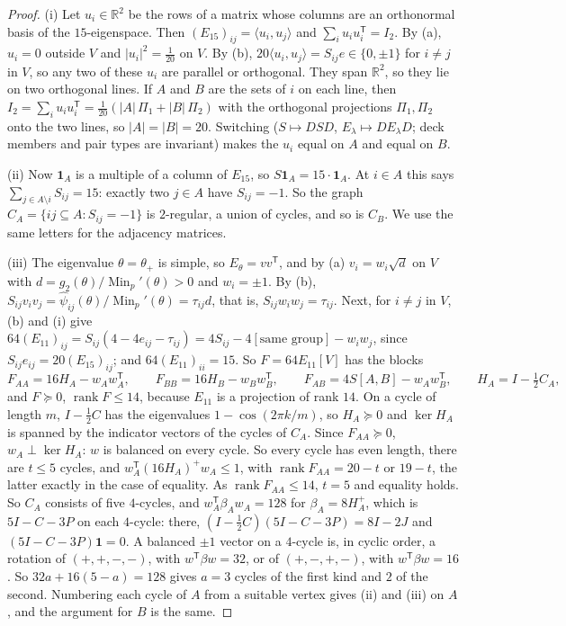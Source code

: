 \documentclass[11pt]{article}
\theoremstyle{definition}
\newcommand{\R}{\mathbb{R}}
\newcommand{\Min}{\operatorname{Min}}
\begin{document}
\begin{proof}
(i) Let $u_i\in\R^2$ be the rows of a matrix whose columns are an orthonormal basis of the
$15$-eigenspace. Then $(E_{15})_{ij}=\langle u_i,u_j\rangle$ and $\sum_iu_iu_i^{\mathsf T}=I_2$. By (a),
$u_i=0$ outside $V$ and $|u_i|^2=\frac1{20}$ on $V$. By (b), $20\langle u_i,u_j\rangle=S_{ij}e\in\{0,\pm1\}$
for $i\ne j$ in $V$, so any two of these $u_i$ are parallel or orthogonal. They span $\R^2$, so they lie on
two orthogonal lines. If $A$ and $B$ are the sets of $i$ on each line, then
$I_2=\sum_iu_iu_i^{\mathsf T}=\frac1{20}(|A|\,\Pi_1+|B|\,\Pi_2)$ with the orthogonal projections $\Pi_1,\Pi_2$
onto the two lines, so $|A|=|B|=20$. Switching ($S\mapsto DSD$, $E_\lambda\mapsto DE_\lambda D$; deck
members and pair types are invariant) makes the $u_i$ equal on $A$ and equal on $B$.

(ii) Now $\mathbf 1_A$ is a multiple of a column of $E_{15}$, so $S\mathbf 1_A=15\cdot\mathbf 1_A$. At
$i\in A$ this says $\sum_{j\in A\setminus i}S_{ij}=15$: exactly two $j\in A$ have $S_{ij}=-1$. So the graph
$C_A=\{ij\subseteq A:S_{ij}=-1\}$ is $2$-regular, a union of cycles, and so is $C_B$. We use the same
letters for the adjacency matrices.

(iii) The eigenvalue $\theta=\theta_+$ is simple, so $E_\theta=vv^{\mathsf T}$, and by (a) $v_i=w_i\sqrt d$
on $V$ with $d=g_2(\theta)/\Min_p'(\theta)>0$ and $w_i=\pm1$. By (b),
$S_{ij}v_iv_j=\widehat\psi_{ij}(\theta)/\Min_p'(\theta)=\tau_{ij}d$, that is, $S_{ij}w_iw_j=\tau_{ij}$. Next, for
$i\ne j$ in $V$, (b) and (i) give $64(E_{11})_{ij}=S_{ij}(4-4e_{ij}-\tau_{ij})=4S_{ij}-4[\text{same
group}]-w_iw_j$, since $S_{ij}e_{ij}=20(E_{15})_{ij}$; and $64(E_{11})_{ii}=15$. So $F=64E_{11}[V]$ has the
blocks
\[
F_{AA}=16H_A-w_Aw_A^{\mathsf T},\qquad F_{BB}=16H_B-w_Bw_B^{\mathsf T},\qquad
F_{AB}=4S[A,B]-w_Aw_B^{\mathsf T},\qquad H_A=I-\tfrac12C_A,
\]
and $F\succeq0$, $\operatorname{rank}F\le14$, because $E_{11}$ is a projection of rank $14$. On a cycle of
length $m$, $I-\frac12C$ has the eigenvalues $1-\cos(2\pi k/m)$, so $H_A\succeq0$ and $\ker H_A$ is
spanned by the indicator vectors of the cycles of $C_A$. Since $F_{AA}\succeq0$, $w_A\perp\ker H_A$: $w$
is balanced on every cycle. So every cycle has even length, there are $t\le5$ cycles, and
$w_A^{\mathsf T}(16H_A)^+w_A\le1$, with $\operatorname{rank}F_{AA}=20-t$ or $19-t$, the latter exactly in
the case of equality. As $\operatorname{rank}F_{AA}\le14$, $t=5$ and equality holds. So $C_A$ consists of
five $4$-cycles, and $w_A^{\mathsf T}\beta_Aw_A=128$ for $\beta_A=8H_A^+$, which is $5I-C-3P$ on each
$4$-cycle: there, $(I-\frac12C)(5I-C-3P)=8I-2J$ and $(5I-C-3P)\mathbf 1=0$. A balanced $\pm1$ vector on
a $4$-cycle is, in cyclic order, a rotation of $(+,+,-,-)$, with $w^{\mathsf T}\beta w=32$, or of
$(+,-,+,-)$, with $w^{\mathsf T}\beta w=16$. So $32a+16(5-a)=128$ gives $a=3$ cycles of the first kind
and $2$ of the second. Numbering each cycle of $A$ from a suitable vertex gives (ii) and (iii) on $A$, and
the argument for $B$ is the same.


\end{proof}
\end{document}
